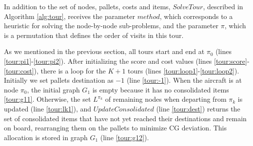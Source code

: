 \documentclass[preprint,authoryear]{elsarticle}
\begin{document}
In addition to the set of nodes, pallets, costs and items, $SolveTour$, described in Algorithm \ref{alg:tour}, receives the parameter $method$, which corresponds to a heuristic for solving the node-by-node sub-problems, and the parameter $\pi$, which is a permutation that defines the order of visits in this tour.

As we mentioned in the previous section, all tours start and end at $\pi_0$\/ (lines \ref{tour:pi1}-\ref{tour:pi2}).
After initializing the score and cost values (lines \ref{tour:score}-\ref{tour:cost}), there is a loop for the $K+1$\/ tours (lines \ref{tour:loop1}-\ref{tour:loop2}). Initially we set pallets destination as $-1$\/ (line \ref{tour:-1}). When the aircraft is at node $\pi_0$, the initial graph $G_1$\/ is empty because it has no consolidated items \ref{tour:g11}. Otherwise, the set $L^{\pi_k}$\/ of remaining nodes when departing from $\pi_k$ is updated (line \ref{tour:lk1}), and $UpdateConsolidated$\/ (line \ref{tour:dest}) returns the set of consolidated items that have not yet reached their destinations and remain on board, rearranging them on the pallets to minimize CG deviation. This allocation is stored in graph $G_1$\/ (line \ref{tour:g12}).
\end{document}
